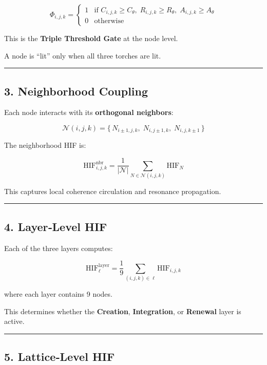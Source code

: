 \[
\Phi_{i,j,k} =
\begin{cases}
1 & \text{if } C_{i,j,k} \ge C_{\theta},\; R_{i,j,k} \ge R_{\theta},\; A_{i,j,k} \ge A_{\theta} \\
0 & \text{otherwise}
\end{cases}
\]

This is the \textbf{Triple Threshold Gate} at the node level.

A node is ``lit'' only when all three torches are lit.

\begin{center}\rule{0.5\linewidth}{0.5pt}\end{center}

\subsection{3. Neighborhood Coupling}\label{neighborhood-coupling}

Each node interacts with its \textbf{orthogonal neighbors}:

\[
\mathcal{N}(i,j,k) = \{\, N_{i\pm1,j,k},\; N_{i,j\pm1,k},\; N_{i,j,k\pm1} \,\}
\]

The neighborhood HIF is:

\[
\text{HIF}^{\text{nbr}}_{i,j,k} = \frac{1}{|\mathcal{N}|} \sum_{N \in \mathcal{N}(i,j,k)} \text{HIF}_N
\]

This captures local coherence circulation and resonance propagation.

\begin{center}\rule{0.5\linewidth}{0.5pt}\end{center}

\subsection{4. Layer‑Level HIF}\label{layerlevel-hif}

Each of the three layers computes:

\[
\text{HIF}^{\text{layer}}_{\ell} = \frac{1}{9} \sum_{(i,j,k) \in \ell} \text{HIF}_{i,j,k}
\]

where each layer contains 9 nodes.

This determines whether the \textbf{Creation}, \textbf{Integration}, or \textbf{Renewal} layer is active.

\begin{center}\rule{0.5\linewidth}{0.5pt}\end{center}

\subsection{5. Lattice‑Level HIF}\label{latticelevel-hif}

